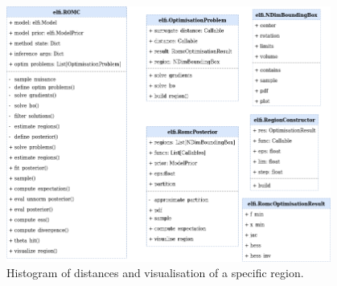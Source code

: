 \begin{figure}[h]
    \begin{center}
      \includegraphics[width=0.95\textwidth]{./Thesis/graphs/RomcEntityDiagram.png}
    \end{center}
  \caption{Histogram of distances and visualisation of a specific region.}
  \label{fig:example_training}
\end{figure}